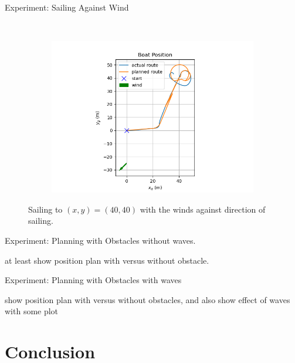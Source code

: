 \documentclass[10pt,xcolor={table,dvipsnames},t]{beamer}
\begin{document}
\begin{frame}{Experiment: Sailing Against Wind}
\begin{figure}
\begin{subfigure}[b]{0.33\textwidth}
         \label{fig:right_wind_speed}
     \end{subfigure}
     \hfill\\
     \begin{subfigure}[b]{0.4\textwidth}
         \centering
         \includegraphics[width=\textwidth,trim={0.5cm 0.0cm 1.25cm 0.5cm },clip]{documents/final_pres_figs/against_wind_to_40_40_pos.png}
         \label{fig:right_wind_pos}
     \end{subfigure}
    \caption{Sailing to \((x,y)=(40,40)\) with the winds against direction of sailing.}
    \label{fig:rstarst}
\end{figure}
\end{frame}

\begin{frame}{Experiment: Planning with Obstacles}
    without waves.
    
    at least show position plan with versus without obstacle.
\end{frame}

\begin{frame}{Experiment: Planning with Obstacles}
    with waves
    
    show position plan with versus without obstacles, and also show effect of waves with some plot
\end{frame}




\section{Conclusion}
\end{document}
